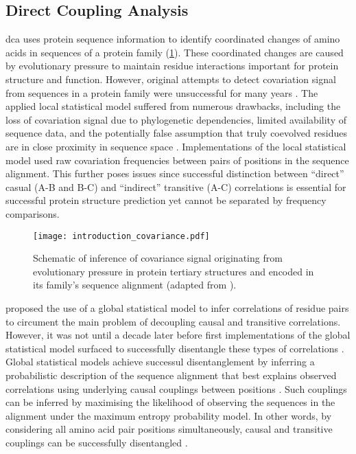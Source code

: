 \subsection{Direct Coupling Analysis}
\Acrlong{dca} uses protein sequence information to identify coordinated changes of amino acids in sequences of a protein family (\cref{fig:introduction_covariance}). These coordinated changes are caused by evolutionary pressure to maintain residue interactions important for protein structure and function. However, original attempts to detect covariation signal from sequences in a protein family were unsuccessful for many years \cite{Taylor1994-es,Gobel1994-rp,Neher1994-qn,Shindyalov1994-yp}. The applied local statistical model suffered from numerous drawbacks, including the loss of covariation signal due to phylogenetic dependencies, limited availability of sequence data, and the potentially false assumption that truly coevolved residues are in close proximity in sequence space \cite{Pollock1997-os,Lapedes1999-cg,Lapedes2012-tu}. Implementations of the local statistical model used raw covariation frequencies between pairs of positions in the sequence alignment. This further poses issues since successful distinction between ``direct'' casual (A-B and B-C) and ``indirect'' transitive (A-C) correlations is essential for successful protein structure prediction yet cannot be separated by frequency comparisons. 

\begin{figure}[H]
    \centering
    \texttt{[image: introduction\_covariance.pdf]}
    \caption[Schematic of inference of covariance signal]{Schematic of inference of covariance signal originating from evolutionary pressure in protein tertiary structures and encoded in its family's sequence alignment (adapted from \cite{Simkovic2017-xs}).}
    \label{fig:introduction_covariance}
\end{figure}

\textcite{Lapedes1999-cg} proposed the use of a global statistical model to infer correlations of residue pairs to circument the main problem of decoupling causal and transitive correlations. However, it was not until a decade later before first implementations of the global statistical model surfaced to successfully disentangle these types of correlations \cite{Weigt2009-sx,Burger2010-ee,Balakrishnan2011-wh,Marks2011-os,Morcos2011-lk,Jones2012-ks,Ekeberg2013-ay,Kamisetty2013-le,Seemayer2014-zp}. Global statistical models achieve successul disentanglement by inferring a probabilistic description of the sequence alignment that best explains observed correlations using underlying causal couplings between positions \cite{Hopf2017-pp}. Such couplings can be inferred by maximising the likelihood of observing the sequences in the alignment under the maximum entropy probability model. In other words, by considering all amino acid pair positions simultaneously, causal and transitive couplings can be successfully disentangled \cite{Ekeberg2013-ay}.

